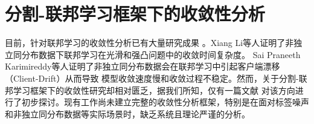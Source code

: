 










\section{分割-联邦学习框架下的收敛性分析}
目前，针对联邦学习的收敛性分析已有大量研究成果 \cite{wang2019adaptive, li2020convergence, khaled2020tighter, karimireddy2020scaffold, koloskova2020unified, li2019convergence}。Xiang Li等人证明了非独立同分布数据下联邦学习在光滑和强凸问题中的收敛时间复杂度\cite{li2019convergence}。
Sai Praneeth Karimireddy等人证明了非独立同分布数据会在联邦学习中引起客户端漂移（Client-Drift）从而导致
模型收敛速度慢和收敛过程不稳定\cite{karimireddy2020scaffold}。然而，关于分割-联邦学习框架下的收敛性研究却相对匮乏，据我们所知，仅有一篇文献 \cite{li2023convergence} 对该方向进行了初步探讨。现有工作尚未建立完整的收敛性分析框架，特别是在面对标签噪声和非独立同分布数据等实际场景时，缺乏系统且理论严谨的分析。
